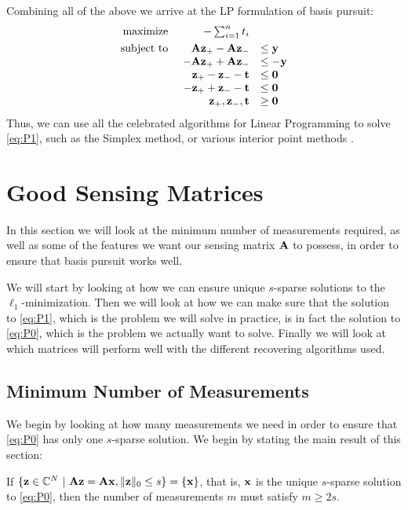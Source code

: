 Combining all of the above we arrive at the LP formulation of basis pursuit:
\begin{equation}
	\begin{array}{r r l l}
		\underset{}{\text{maximize}}~ & -\sum_{i=1}^{n} t_{i}         &          &  \\
		 \quad\text{subject to}~ & \mathbf{A}\mathbf{z}_{+} - \mathbf{A}\mathbf{z}_{-}           & \leq \mathbf{y}  &  \\
		            & -\mathbf{A}\mathbf{z}_{+} + \mathbf{A}\mathbf{z}_{-}          & \leq -\mathbf{y} &  \\
		            & \mathbf{z}_{+} - \mathbf{z}_{-} - \mathbf{t}  & \leq \mathbf{0}  &  \\
		            & -\mathbf{z}_{+} + \mathbf{z}_{-} - \mathbf{t} & \leq \mathbf{0}  &  \\
		            & \mathbf{z}_{+}, \mathbf{z}_{-}, \mathbf{t}    & \geq \mathbf{0}   &
	\end{array}
\end{equation}
Thus, we can use all the celebrated algorithms for Linear Programming to solve \eqref{eq:P1}, such as the Simplex method, or various interior point methods \cite{vanderbei14linprog}.










\section{Good Sensing Matrices}
\label{sec:goodmatrices}
In this section we will look at the minimum number of measurements required, as well as some of the features we want our sensing matrix $ \mathbf{A} $ to possess, in order to ensure that basis pursuit works well. 

We will start by looking at how we can ensure unique $ s $-sparse solutions to the $ \ell_{1} $-minimization. Then we will look at how we can make sure that the solution to \eqref{eq:P1}, which is the problem we will solve in practice, is in fact the solution to \eqref{eq:P0}, which is the problem we actually want to solve. Finally we will look at which matrices will perform well with the different recovering algorithms used.





\subsection{Minimum Number of Measurements}
\label{sec:minimum_measurements}
We begin by looking at how many measurements we need in order to ensure that \eqref{eq:P0} has only one $ s $-sparse solution. We begin by stating the main result of this section:
\begin{theorem}
	\label{thm:minimum_measurements}
	If $ \{\mathbf{z} \in \mathbb{C}^{N} ~|~ \mathbf{A}\mathbf{z} = \mathbf{A}\mathbf{x}, \lVert\mathbf{z}\rVert_{0} \leq s\}  = \{\mathbf{x}\} $, that is, $ \mathbf{x} $ is the unique $ s $-sparse solution to \eqref{eq:P0}, then the number of measurements $ m $ must satisfy $ m \geq 2s $.
\end{theorem}

